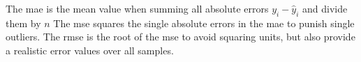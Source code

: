 The \gls{mae} is the mean value when summing all absolute errors $y_i - \hat{y}_i$ and divide them by $n$
The \gls{mse} squares the single absolute errors in the \gls{mae} to punish single outliers.
The \gls{rmse} is the root of the \gls{mse} to avoid squaring units, but also provide a realistic error values over all samples.

